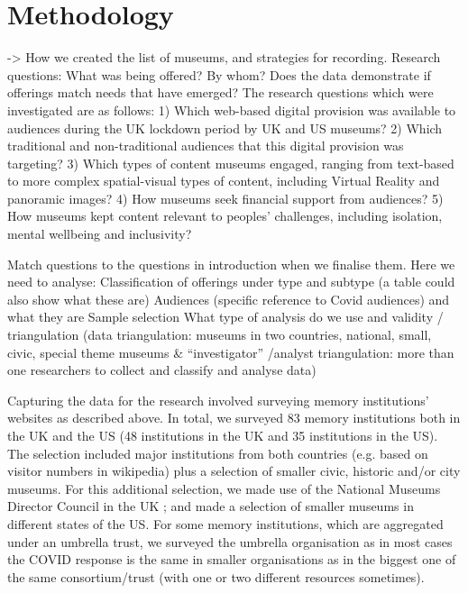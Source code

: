\documentclass{egpubl}
\begin{document}

\section{Methodology}
-> How we created the list of museums, and strategies for recording.
Research questions:
What  was being offered? By whom?
Does the data demonstrate if offerings match needs that have emerged?
The research questions which were investigated are as follows:
1) Which web-based digital provision was available to audiences during the UK lockdown period by UK and US museums? 
2) Which traditional and non-traditional audiences that this digital provision was targeting?
3) Which types of content museums engaged, ranging from text-based to more complex spatial-visual types of content, including Virtual Reality and panoramic images?
4) How museums seek financial support from audiences?
5) How museums kept content relevant to peoples’ challenges, including isolation, mental wellbeing and inclusivity?

Match questions to the questions in introduction when we finalise them.
Here we need to analyse:
Classification of offerings under type and subtype (a table could also show what these are)
Audiences (specific reference to Covid audiences) and what they are
Sample selection 
What type of analysis do we use and validity / triangulation (data triangulation: museums in two countries, national, small, civic, special theme museums \& “investigator” /analyst  triangulation: more than one researchers to collect and classify and analyse data)


Capturing the data for the research involved surveying memory institutions’ websites as described above. In total, we surveyed 83 memory institutions both in the UK and the US (48 institutions in the  UK and 35 institutions in the US). The selection included major institutions from both countries (e.g. based on visitor numbers in wikipedia) plus a selection of smaller civic, historic and/or city museums. For this additional selection, we made use of the National Museums Director Council in the UK \cite{nationalmuseums:2020}; and made a selection of smaller museums in different states of the US. For some memory institutions, which are aggregated under an umbrella trust, we surveyed the umbrella organisation as in most cases the COVID response is the same in smaller organisations as in the biggest one of the same consortium/trust (with one or two different resources sometimes).
\end{document}

